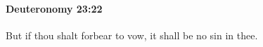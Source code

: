 
		\paragraph{Deuteronomy 23:22} %
			\label{DEUTERONOMY-23-22}

			But if thou shalt forbear to vow, it shall be no sin in thee.


